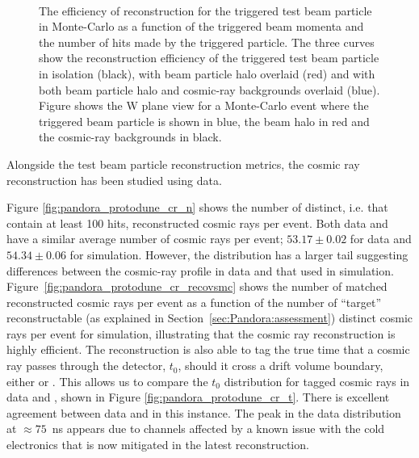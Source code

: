 \begin{figure}[!ht] %
\centering
{}
 \\
\caption[Reconstruction efficiency for test beam particle in MC per momentum and hits]{The efficiency of reconstruction for the triggered test beam particle in Monte-Carlo as a function of \protect{} the triggered beam momenta and \protect{} the number of hits made by the triggered particle.  The three curves show the reconstruction efficiency of the triggered test beam particle in isolation (black), with beam particle halo overlaid (red) and with both beam particle halo and cosmic-ray backgrounds overlaid (blue).  Figure \protect{} shows the W plane view for a Monte-Carlo event where the triggered beam particle is shown in blue, the beam halo in red and the cosmic-ray backgrounds in black.}
\label{fig:pandora_protodune_tbrecoeffbrkdwn}
\end{figure} 

Alongside the test beam particle reconstruction metrics, the  cosmic ray reconstruction has been studied using  data. 

Figure \ref{fig:pandora_protodune_cr_n} shows the number of distinct, i.e. that contain at least 100 hits, reconstructed cosmic rays per event.  Both data and  have a similar average number of cosmic rays per event; $53.17\pm0.02$ for data and $54.34\pm0.06$ for simulation.  However, the  distribution has a larger tail suggesting differences between the cosmic-ray profile in data and that used in simulation. Figure~\ref{fig:pandora_protodune_cr_recovsmc} shows the number of matched reconstructed cosmic rays per event as a function of the number of ``target'' reconstructable (as explained in Section~\ref{sec:Pandora:assessment}) distinct cosmic rays per event for  simulation, illustrating that the  cosmic ray reconstruction is highly efficient.  The  reconstruction is also able to tag the true time that a cosmic ray passes through the detector, $t_{0}$, should it cross a drift volume boundary, either  or .  This allows us to compare the $t_{0}$ distribution for tagged cosmic rays in data and , shown in Figure \ref{fig:pandora_protodune_cr_t}.  There is excellent agreement between data and  in this instance.  The peak in the data distribution at $\approx 75$~ns appears due to channels affected by a known issue with the cold electronics that is now mitigated in the latest reconstruction.

